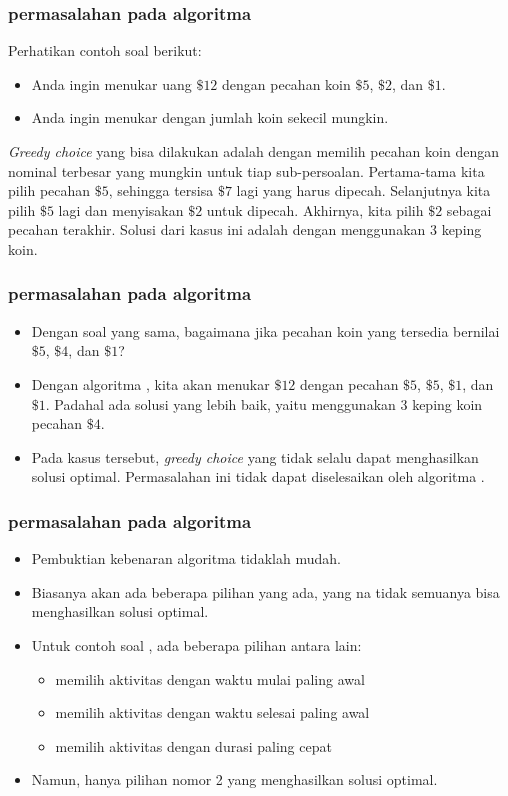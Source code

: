 \begin{frame}
	\frametitle{permasalahan pada algoritma }
	Perhatikan contoh soal berikut:
	\begin{itemize}
		\item Anda ingin menukar uang $\$12$ dengan pecahan koin $\$5$, $\$2$, dan $\$1$.
		\item Anda ingin menukar dengan jumlah koin sekecil mungkin.
	\end{itemize}
	\textit{Greedy choice} yang bisa dilakukan adalah dengan memilih pecahan koin dengan nominal terbesar yang mungkin untuk tiap sub-persoalan. Pertama-tama kita pilih pecahan $\$5$, sehingga tersisa $\$7$ lagi yang harus dipecah. Selanjutnya kita pilih $\$5$ lagi dan menyisakan $\$2$ untuk dipecah. Akhirnya, kita pilih $\$2$ sebagai pecahan terakhir. Solusi dari kasus ini adalah dengan menggunakan 3 keping koin.
\end{frame}

\begin{frame}
	\frametitle{permasalahan pada algoritma }
	\begin{itemize}
		\item Dengan soal yang sama, bagaimana jika pecahan koin yang tersedia bernilai $\$5$, $\$4$, dan $\$1$?
		\item Dengan algoritma , kita akan menukar  $\$12$ dengan pecahan $\$5$, $\$5$, $\$1$, dan $\$1$. Padahal ada solusi yang lebih baik, yaitu menggunakan 3 keping koin pecahan $\$4$.
		\item Pada kasus tersebut, \textit{greedy choice} yang tidak selalu dapat menghasilkan solusi optimal. Permasalahan ini tidak dapat diselesaikan oleh algoritma .
	\end{itemize}
\end{frame}

\begin{frame}
	\frametitle{permasalahan pada algoritma }
	\begin{itemize}
		\item Pembuktian kebenaran algoritma  tidaklah mudah.
		\item Biasanya akan ada beberapa pilihan   yang ada, yang na tidak semuanya bisa menghasilkan solusi optimal.
		\item Untuk contoh soal  , ada beberapa pilihan   antara lain:
		\begin{itemize}
			\item memilih aktivitas dengan waktu mulai paling awal
			\item memilih aktivitas dengan waktu selesai paling awal
			\item memilih aktivitas dengan durasi paling cepat
		\end{itemize}
		\item Namun, hanya pilihan nomor 2 yang menghasilkan solusi optimal.
	\end{itemize}
\end{frame}

